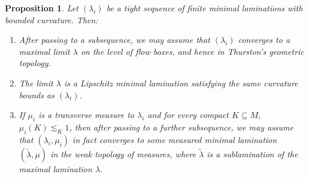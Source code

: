 \documentclass[reqno,11pt]{amsart}
\newtheorem{proposition}[theorem]{Proposition}
\theoremstyle{definition}
\numberwithin{equation}{section}
\begin{document}
\begin{proposition}\label{compactness in flow boxes and Thurston}
Let $(\lambda_i)$ be a tight sequence of finite minimal laminations with bounded curvature. Then:
\begin{enumerate}
\item After passing to a subsequence, we may assume that $(\lambda_i)$ converges to a maximal limit $\lambda$ on the level of flow boxes, and hence in Thurston's geometric topology.
\item The limit $\lambda$ is a Lipschitz minimal lamination satisfying the same curvature bounds as $(\lambda_i)$.
\item If $\mu_i$ is a transverse measure to $\lambda_i$ and for every compact $K \subseteq M$, $\mu_i(K) \lesssim_K 1$, then after passing to a further subsequence, we may assume that $(\lambda_i, \mu_i)$ in fact converges to some measured minimal lamination $(\tilde \lambda, \mu)$ in the weak topology of measures, where $\tilde \lambda$ is a sublamination of the maximal lamination $\lambda$.
\end{enumerate}
\end{proposition}
\end{document}
